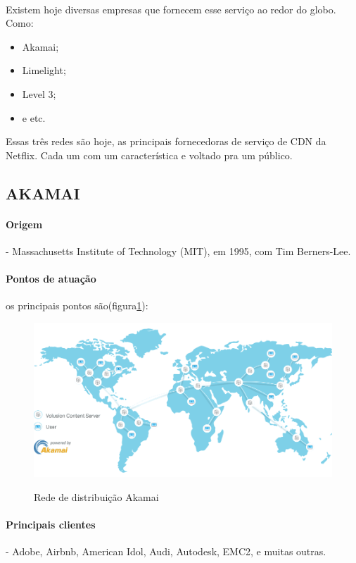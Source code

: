 \paragraph{}
Existem hoje diversas empresas que fornecem esse servi\c{c}o ao redor do globo. Como:
\begin{itemize}
\item Akamai;
\item Limelight;
\item Level 3;
\item e etc.
\end{itemize}

Essas tr\^es redes s\~ao hoje, as principais fornecedoras de servi\c{c}o de CDN da Netflix. Cada um com um caracter\'istica e voltado pra um p\'ublico.
\subsection{AKAMAI}
\paragraph{Origem}- Massachusetts Institute of Technology (MIT), em 1995, com Tim Berners-Lee.
\paragraph{Pontos de atua\c{c}\~ao} os principais pontos s\~ao(figura\ref{figura:akamai_map}):
\begin{figure}[H]
\caption{Rede de distribui\c{c}\~ao Akamai}
\includegraphics[width=14cm]{Figuras/akamai_map.png} 
\label{figura:akamai_map}
\end{figure}
\paragraph{Principais clientes}- Adobe, Airbnb, American Idol, Audi, Autodesk, EMC2, e muitas outras.
